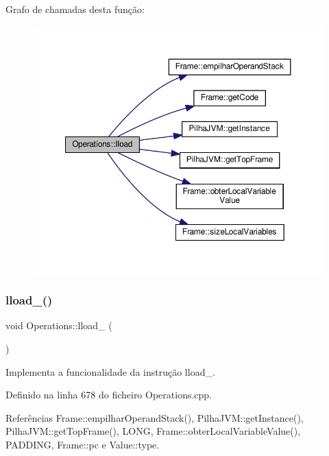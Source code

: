 Grafo de chamadas desta função\+:\nopagebreak
\begin{figure}[H]
\begin{center}
\leavevmode
\includegraphics[width=350pt]{classOperations_abd9d44b782cc5ae7d7985a424a0985c6_cgraph}
\end{center}
\end{figure}
\mbox{\label{classOperations_a556b64c0764f7a654a30540eb355aab3}} 
\subsubsection{\texorpdfstring{lload\+\_()}{lload\_0()}}
{\footnotesize\ttfamily void Operations\+::lload\+\_ (\begin{DoxyParamCaption}{ }\end{DoxyParamCaption})\hspace{0.3cm}{\ttfamily [private]}}



Implementa a funcionalidade da instrução lload\+\_. 



Definido na linha 678 do ficheiro Operations.\+cpp.



Referências Frame\+::empilhar\+Operand\+Stack(), Pilha\+J\+V\+M\+::get\+Instance(), Pilha\+J\+V\+M\+::get\+Top\+Frame(), L\+O\+NG, Frame\+::obter\+Local\+Variable\+Value(), P\+A\+D\+D\+I\+NG, Frame\+::pc e Value\+::type.



